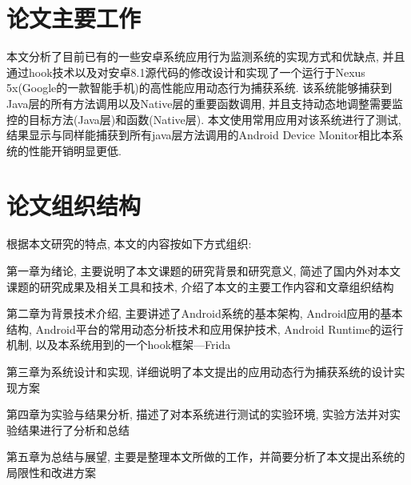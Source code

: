 \section{论文主要工作}
本文分析了目前已有的一些安卓系统应用行为监测系统的实现方式和优缺点, 并且通过hook技术以及对安卓8.1源代码的修改设计和实现了一个运行于Nexus 5x(Google的一款智能手机)的高性能应用动态行为捕获系统. 该系统能够捕获到Java层的所有方法调用以及Native层的重要函数调用, 并且支持动态地调整需要监控的目标方法(Java层)和函数(Native层). 本文使用常用应用对该系统进行了测试, 结果显示与同样能捕获到所有java层方法调用的Android Device Monitor相比本系统的性能开销明显更低.

\section{论文组织结构}
根据本文研究的特点, 本文的内容按如下方式组织:

第一章为绪论, 主要说明了本文课题的研究背景和研究意义, 简述了国内外对本文课题的研究成果及相关工具和技术, 介绍了本文的主要工作内容和文章组织结构\juhao 

第二章为背景技术介绍, 主要讲述了Android系统的基本架构, Android应用的基本结构, Android平台的常用动态分析技术和应用保护技术, Android Runtime的运行机制, 以及本系统用到的一个hook框架---Frida\juhao

第三章为系统设计和实现, 详细说明了本文提出的应用动态行为捕获系统的设计实现方案\juhao

第四章为实验与结果分析, 描述了对本系统进行测试的实验环境, 实验方法并对实验结果进行了分析和总结\juhao

第五章为总结与展望, 主要是整理本文所做的工作，并简要分析了本文提出系统的局限性和改进方案\juhao

 